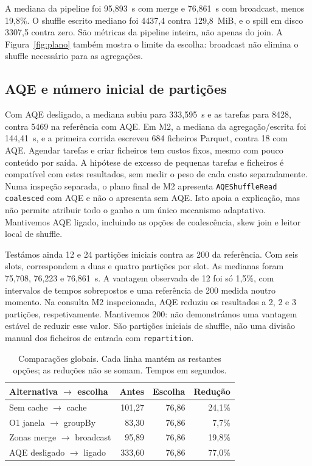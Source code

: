 \documentclass[sigconf]{acmart}
\begin{document}
A mediana da pipeline foi 95,893~s com merge e 76,861~s com
broadcast, menos 19,8\%. O shuffle escrito mediano foi
4437,4 contra 129,8~MiB, e o spill em disco 3307,5 contra zero.
São métricas da pipeline inteira, não apenas do join.
A Figura~\ref{fig:plano} também mostra o limite da escolha:
broadcast não elimina o shuffle necessário para as agregações.

\subsection{AQE e número inicial de partições}
Com AQE desligado, a mediana subiu para 333,595~s e as tarefas
para 8428, contra 5469 na referência com AQE. Em M2, a mediana
da agregação/escrita foi 144,41~s, e a primeira corrida escreveu
684 ficheiros Parquet, contra 18 com AQE. Agendar tarefas e criar ficheiros tem custos fixos, mesmo com pouco
conteúdo por saída. A hipótese de excesso de pequenas tarefas e
ficheiros é compatível com estes resultados, sem medir o peso de
cada custo separadamente.
Numa inspeção separada, o plano final de M2 apresenta
\texttt{AQEShuffleRead coalesced} com AQE e não o apresenta sem AQE.
Isto apoia a explicação, mas não permite atribuir todo o ganho a
um único mecanismo adaptativo. Mantivemos AQE ligado, incluindo as
opções de coalescência, skew join e leitor local de shuffle.

Testámos ainda 12 e 24 partições iniciais contra as 200 da referência.
Com seis slots, correspondem a duas e quatro partições por slot.
As medianas foram 75,708, 76,223 e 76,861~s. A vantagem observada
de 12 foi só 1,5\%, com intervalos de tempos sobrepostos e uma
referência de 200 medida noutro momento. Na consulta M2 inspecionada,
AQE reduziu os resultados a 2, 2 e 3 partições, respetivamente.
Mantivemos 200: não demonstrámos uma vantagem estável de reduzir
esse valor. São partições iniciais de shuffle, não uma divisão
manual dos ficheiros de entrada com \texttt{repartition}.

\begin{table}[t]
\centering
\caption{Comparações globais. Cada linha mantém as restantes opções;
as reduções não se somam. Tempos em segundos.}
\label{tab:otimizacoes}
\begin{tabular}{lrrr}
\toprule
Alternativa $\rightarrow$ escolha & Antes & Escolha & Redução \\
\midrule
Sem cache $\rightarrow$ cache & 101,27 & 76,86 & 24,1\% \\
O1 janela $\rightarrow$ groupBy & 83,30 & 76,86 & 7,7\% \\
Zonas merge $\rightarrow$ broadcast & 95,89 & 76,86 & 19,8\% \\
AQE desligado $\rightarrow$ ligado & 333,60 & 76,86 & 77,0\% \\
\bottomrule
\end{tabular}
\end{table}
\end{document}

